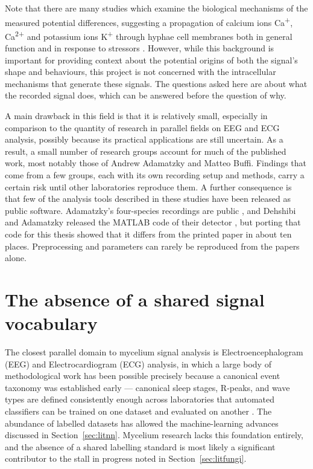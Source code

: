 Note that there are many studies which examine the biological mechanisms of the measured potential differences, suggesting a propagation of calcium ions Ca\textsuperscript{+}, Ca\textsuperscript{2+} and potassium ions K\textsuperscript{+} through hyphae cell membranes both in general function and in response to stressors \cite{brand,itani,houdinet}. However, while this background is important for providing context about the potential origins of both the signal's shape and behaviours, this project is not concerned with the intracellular mechanisms that generate these signals. The questions asked here are about what the recorded signal does, which can be answered before the question of why.

A main drawback in this field is that it is relatively small, especially in comparison to the quantity of research in parallel fields on EEG and ECG analysis, possibly because its practical applications are still uncertain. As a result, a small number of research groups account for much of the published work, most notably those of Andrew Adamatzky and Matteo Buffi. Findings that come from a few groups, each with its own recording setup and methods, carry a certain risk until other laboratories reproduce them. A further consequence is that few of the analysis tools described in these studies have been released as public software. Adamatzky's four-species recordings are public \cite{adamatzky2021data}, and Dehshibi and Adamatzky released the MATLAB code of their detector \cite{dehshibi2020code}, but porting that code for this thesis showed that it differs from the printed paper in about ten places. Preprocessing and parameters can rarely be reproduced from the papers alone.

\section{The absence of a shared signal vocabulary}
\label{sec:litvocab}

The closest parallel domain to mycelium signal analysis is Electroencephalogram (EEG) and Electrocardiogram (ECG) analysis, in which a large body of methodological work has been possible precisely because a canonical event taxonomy was established early --- canonical sleep stages, R-peaks, and wave types are defined consistently enough across laboratories that automated classifiers can be trained on one dataset and evaluated on another \cite{murungi} \cite{mohammed}. The abundance of labelled datasets has allowed the machine-learning advances discussed in Section~\ref{sec:litnn}. Mycelium research lacks this foundation entirely, and the absence of a shared labelling standard is most likely a significant contributor to the stall in progress noted in Section~\ref{sec:litfungi}.

